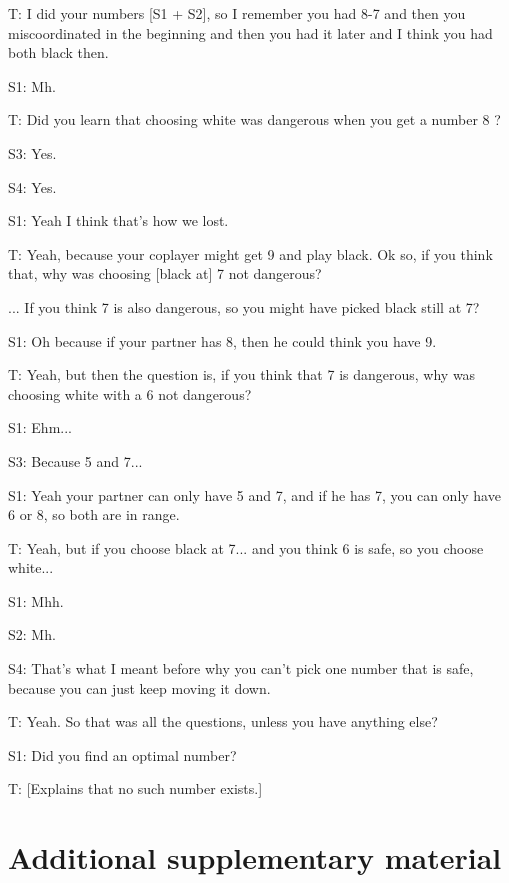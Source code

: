 \documentclass[a4paper,superscriptaddress,nofootinbib]{revtex4}
\begin{document}
T: I did your numbers [S1 + S2], so I remember you had 8-7 and then you miscoordinated in the beginning and then you had it later and I think you had both black then.

S1: Mh.

T: Did you learn that choosing white was dangerous when you get a number 8 ?

S3: Yes.

S4: Yes.

S1: Yeah I think that's how we lost.

T: Yeah, because your coplayer might get 9 and play black. Ok so, if you think that, why was choosing [black at] 7 not dangerous? 

... If you think 7 is also dangerous, so you might have picked black still at 7?

S1: Oh because if your partner has 8, then he could think you have 9.

T: Yeah, but then the question is, if you think that 7 is dangerous, why was choosing white with a 6 not dangerous?

S1: Ehm...

S3: Because 5 and 7...

S1: Yeah your partner can only have 5 and 7, and if he has 7, you can only have 6 or 8, so both are in range.

T: Yeah, but if you choose black at 7... and you think 6 is safe, so you choose white...

S1: Mhh.

S2: Mh.

S4: That's what I meant before why you can't pick one number that is safe, because you can just keep moving it down.

T: Yeah. So that was all the questions, unless you have anything else?

S1: Did you find an optimal number?

T: [Explains that no such number exists.]
 

\section{Additional supplementary material}
\end{document}
